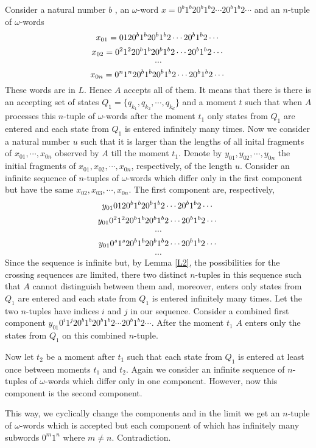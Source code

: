 \documentclass{llncs}
\begin{document}
Consider a natural number $b$ , an $\omega $-word $x = 0^b1^b20^b1^b2\cdots 20^b1^b2\cdots $ and an $n$-tuple of $\omega $-words
$$
x_{01} = 0120^b1^b20^b1^b2\cdots 20^b1^b2\cdots \\
$$
$$
x_{02} = 0^21^220^b1^b20^b1^b2\cdots 20^b1^b2\cdots \\
$$
$$
\cdots
$$
$$
x_{0n} = 0^n1^n20^b1^b20^b1^b2\cdots 20^b1^b2\cdots \\
$$
These words are in $L$. Hence $A$ accepts all of them. It means that there is there is an accepting set of states $Q_1 = \{q_{k_1}, q_{k_2}, \cdots , q_{k_d}\}$
and a moment $t$ such that when $A$ processes this $n$-tuple of $\omega $-words after the moment $t_1$ only states from $Q_1$ are entered and each state from 
$Q_1$ is entered infinitely many times. Now we consider a natural number $u$ such that it is larger than the lengths of all inital fragments of $x_{01}, \cdots , x_{0n}$ observed by $A$ till the moment $t_1$. Denote by $y_{01}, y_{02}, \cdots , y_{0n}$ the initial fragments of $x_{01}, x_{02}, \cdots , x_{0n}$, respectively,
of the length $u$. Consider an infinite sequence of $n$-tuples of $\omega $-words which differ only in the first component but have the same $x_{02}, x_{03}, \cdots , x_{0n}$. The first component are, respectively,
$$
y_{01}0120^b1^b20^b1^b2\cdots 20^b1^b2\cdots \\
$$
$$
y_{01}0^21^220^b1^b20^b1^b2\cdots 20^b1^b2\cdots \\
$$
$$
\cdots
$$
$$
y_{01}0^s1^s20^b1^b20^b1^b2\cdots 20^b1^b2\cdots \\
$$
$$
\cdots
$$
Since the sequence is infinite but, by Lemma \ref{L2}, the possibilities for the crossing sequences are limited, there two distinct $n$-tuples in this sequence 
such that $A$ cannot distinguish between them and, moreover, enters only states from $Q_1$ are entered and each state from 
$Q_1$ is entered infinitely many times. Let the two $n$-tuples have indices $i$ and $j$ in our sequence. Consider a combined first component
$y_{01}0^i1^j20^b1^b20^b1^b2\cdots 20^b1^b2\cdots $. After the moment $t_1$ $A$ enters only the states from $Q_1$ on this combined $n$-tuple.

Now let $t_2$ be a moment after $t_1$ such that each state from 
$Q_1$ is entered at least once between moments $t_1$ and $t_2$. Again we consider an infinite sequence of $n$-tuples of $\omega $-words which differ only in one  component. However, now this component is the second component. 

This way, we cyclically change the components and in the limit we get an $n$-tuple of $\omega $-words which is accepted but each component of which has infinitely many subwords $0^m1^n$ where $m\neq n$. Contradiction.
\end{document}
